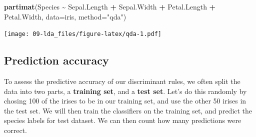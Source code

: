 \documentclass[
]{book}
\newenvironment{Shaded}{\begin{snugshade}}{\end{snugshade}}
\newcommand{\AttributeTok}[1]{\textcolor[rgb]{0.13,0.29,0.53}{#1}}
\newcommand{\DecValTok}[1]{\textcolor[rgb]{0.00,0.00,0.81}{#1}}
\newcommand{\FunctionTok}[1]{\textcolor[rgb]{0.13,0.29,0.53}{\textbf{#1}}}
\newcommand{\NormalTok}[1]{#1}
\newcommand{\OtherTok}[1]{\textcolor[rgb]{0.56,0.35,0.01}{#1}}
\newcommand{\SpecialCharTok}[1]{\textcolor[rgb]{0.81,0.36,0.00}{\textbf{#1}}}
\newcommand{\StringTok}[1]{\textcolor[rgb]{0.31,0.60,0.02}{#1}}
\theoremstyle{definition}
\theoremstyle{definition}
\theoremstyle{definition}
\theoremstyle{definition}
\theoremstyle{remark}
\begin{document}
\begin{Shaded}
\begin{Highlighting}[]
\FunctionTok{partimat}\NormalTok{(Species }\SpecialCharTok{\textasciitilde{}}\NormalTok{ Sepal.Length }\SpecialCharTok{+}\NormalTok{ Sepal.Width }\SpecialCharTok{+}\NormalTok{ Petal.Length }\SpecialCharTok{+} 
\NormalTok{           Petal.Width,         }\AttributeTok{data=}\NormalTok{iris, }\AttributeTok{method=}\StringTok{"qda"}\NormalTok{)}
\end{Highlighting}
\end{Shaded}

\texttt{[image: 09-lda\_files/figure-latex/qda-1.pdf]}

\hypertarget{prediction-accuracy}{%
\subsection{Prediction accuracy}\label{prediction-accuracy}}

To assess the predictive accuracy of our discriminant rules, we often split the data into two parts, a \textbf{training set}, and a \textbf{test set}. Let's do this randomly by chosing 100 of the irises to be in our training set, and use the other 50 irises in the test set. We will then train the classifiers on the training set, and predict the species labels for test dataset. We can then count how many predictions were correct.

\begin{Shaded}
\end{Shaded}
\end{document}
